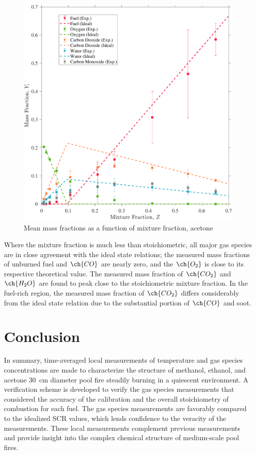\documentclass[12pt]{article}
\begin{document}
\begin{figure}[!]
	\centering
\includegraphics[width=\textwidth,keepaspectratio]{Adjusted_FuelAcetone_Mixture_Fraction_Intermediate_Plot.pdf}
	\caption[Mean mass fractions as a function of mixture fraction, acetone]{Mean mass fractions as a function of mixture fraction, acetone}
	\label{fig:Acetone_Mix_Frac}
\end{figure}

Where the mixture fraction is much less than stoichiometric, all major gas species are in close agreement with the ideal state relations; the measured mass fractions of unburned fuel and $\ch{CO}$ are nearly zero, and the $\ch{O_2}$ is close to its respective theoretical value. The measured mass fraction of $\ch{CO_{2}}$ and $\ch{H_{2}O}$ are found to peak close to the stoichiometric mixture fraction. In the fuel-rich region, the measured mass fraction of $\ch{CO_{2}}$ differs considerably from the ideal state relation due to the substantial portion of $\ch{CO}$ and soot.




\clearpage

\section{Conclusion}
\label{sec:Conclusion}
In summary, time-averaged local measurements of temperature and gas species concentrations are made to characterize the structure of methanol, ethanol, and acetone \SI{30}{cm} diameter pool fire steadily burning in a quiescent environment. A verification scheme is developed to verify the gas species measurements that considered  the accuracy of the calibration and the overall stoichiometry of combustion for each fuel. The gas species measurements are favorably compared to the idealized SCR values, which lends confidence to the veracity of the measurements. These local measurements complement previous measurements and provide insight into the complex chemical structure of medium-scale pool fires.
\end{document}
